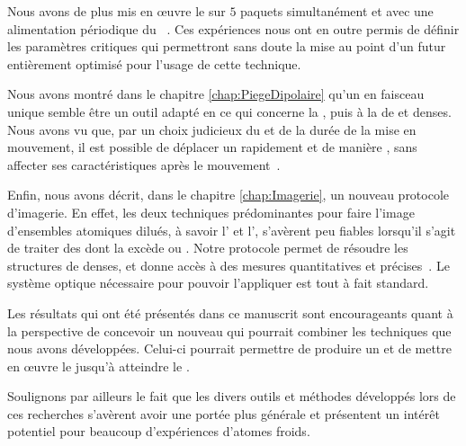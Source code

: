 Nous avons de plus mis en \oe uvre le \rpef sur $5$ paquets simultanément et avec une alimentation périodique du \tp~\cite{LRW06}. 
Ces expériences nous ont en outre permis de définir les paramètres critiques qui permettront sans doute la mise au point d'un futur \setup entièrement optimisé pour l'usage de cette technique. 

\vspace{1ex}
\vspace{1ex}

Nous avons montré dans le chapitre \ref{chap:PiegeDipolaire} qu'un \pd en faisceau unique semble être un outil adapté en ce qui concerne la , puis à la  de \patufs et denses. 
Nous avons vu que, par un choix judicieux du \pacc et de la durée de la mise en mouvement, il est possible de déplacer un \nat rapidement et de manière , \cad sans affecter ses caractéristiques après le mouvement~\cite{CKR08}.


\vspace{1ex}
\vspace{1ex}

Enfin, nous avons décrit, dans le 
chapitre \ref{chap:Imagerie}, un nouveau protocole d'imagerie. En effet, les deux techniques prédominantes pour faire l'image d'ensembles atomiques dilués, à savoir l' et l', s'avèrent peu fiables lorsqu'il s'agit de traiter des \ns dont la \pro excède  ou .
Notre protocole permet de résoudre les structures de \nats denses, et donne accès à des mesures quantitatives et précises~\cite{RLW07}. 
Le système optique nécessaire pour pouvoir l'appliquer est tout à fait standard.



\vspace{1ex}
\vspace{1ex}
\vspace{1ex}


Les résultats qui ont été présentés dans ce manuscrit sont encourageants quant à la perspective de concevoir un nouveau \setup qui pourrait combiner les techniques que nous avons développées. Celui-ci pourrait permettre de produire un \jat \uf et de mettre en \oe uvre le \rpef jusqu'à atteindre le \rdq. 

Soulignons par ailleurs le fait que les divers outils et méthodes développés lors de ces recherches s'avèrent avoir une portée plus générale et présentent un intérêt potentiel pour beaucoup d'expériences d'atomes froids. 






